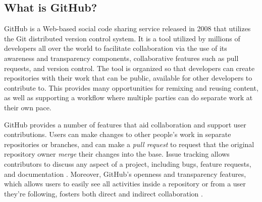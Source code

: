 \subsection{What is GitHub?}
GitHub is a Web-based social code sharing service released in 2008 that utilizes the Git distributed version control system. It is a tool utilized by millions of developers all over the world to facilitate collaboration via the use of its awareness and transparency components, collaborative features such as pull requests, and version control. The tool is organized so that developers can create repositories with their work that can be public, available for other developers to contribute to. This provides many opportunities for remixing and reusing content, as well as supporting a workflow where multiple parties can do separate work at their own pace.

GitHub provides a number of features that aid collaboration and support user contributions. Users can make changes to other people's work in separate repositories or branches, and can make a \emph{pull request} to request that the original repository owner \emph{merge} their changes into the base. Issue tracking allows contributors to discuss any aspect of a project, including bugs, feature requests, and documentation \cite{bissyande2013got}. Moreover, GitHub's openness and transparency features, which allows users to easily see all activities inside a repository or from a user they're following, fosters both direct and indirect collaboration \cite{dabbish2012social}.

